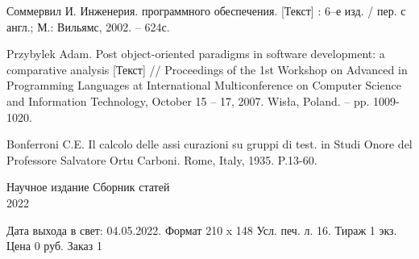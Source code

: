\documentclass{book}
\begin{document}
\begin{thebibliography}{3}
Соммервил И. Инженерия. программного обеспечения. [Текст] : 6--е изд. / пер. с англ.; М.: Вильямс, 2002. -- 624с.

Przybylek Adam. Post object-oriented paradigms in software development: a comparative analysis [Текст] // Proceedings of the 1st Workshop on Advanced in Programming Languages at International Multiconference on Computer Science and Information Technology, October 15 -- 17, 2007. Wisła, Poland. -- pp. 1009-1020.

 Bonferroni C.E. Il calcolo delle assi curazioni su gruppi di test. in Studi
Onore del Professore Salvatore Ortu Carboni. Rome, Italy, 1935. P.13-60.

\end{thebibliography}
\newpage \null
\renewcommand\indexname{Авторский указатель}
\printindex \thispagestyle{empty}

\newpage\thispagestyle{empty}

    \begin{center}
    \vspace{15cm}
    \Large Научное издание \linebreak
    Сборник статей\\
    2022
    
    
    Дата выхода в свет: 04.05.2022. Формат 210 x 148\linebreak
    Усл. печ. л. 16. Тираж 1 экз. Цена 0 руб. Заказ 1
    \thispagestyle{empty}
    \end{center}
    
\end{document}
